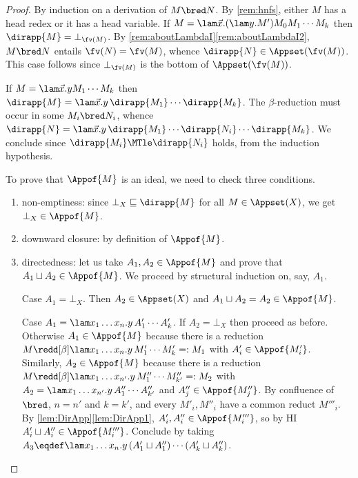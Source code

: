 	\begin{proof}
	\bsub
	\item By induction on a derivation of $M\bred N$. By \cref{rem:hnfs}, 
		either $M$ has a head redex or it has a head variable.
		If $M = \lam \vec x.(\lam y.M')M_0M_1\cdots M_k$ then 
		$\dirapp{M} = \bot_{\fv(M)}$. 
		By \cref{rem:aboutLambdaI}\eqref{rem:aboutLambdaI2}, 
		$M\bred N$ entails $\fv(N) = \fv(M)$, 
		whence $\dirapp{N}\in\Appset(\fv(M))$.
		This case follows since $\bot_{\fv(M)}$ is the bottom of 
		$\Appset(\fv(M))$.
		
		If $M = \lam \vec x.yM_1\cdots M_k$ then $\dirapp{M} = \lam \vec 
		x.y\,\dirapp{M_1}\cdots \dirapp{M_k}$.
		The $\beta$-reduction must occur in some $M_i\bred N_i$, whence 
		$\dirapp{N} = \lam \vec x.y\,\dirapp{M_1}\cdots \dirapp{N_i}\cdots 
		\dirapp{M_k}$. We conclude since $\dirapp{M_i}\MTle\dirapp{N_i}$ 
		holds, from the induction hypothesis.
			
		\item To prove that $\Appof{M}$ is an ideal, we need to check three 
		conditions.
		\begin{enumerate}
		\item
			non-emptiness: since $\bot_{X}\sqsubseteq \dirapp{M}$ for all 
			$M\in\Appset(X)$, we get $\bot_{X} \in \Appof{M}$.
		\item
			downward closure: by definition of $\Appof{M}$.
		\item
			directedness: let us take $A_1,A_2\in\Appof{M}$ and prove that 
			$A_1\sqcup A_2\in\Appof{M}$.
			We proceed by structural induction on, say, $A_1$.
			
			Case $A_1 = \bot_X$. Then $A_2\in\Appset(X)$ and $A_1\sqcup A_2 
			= A_2\in\Appof{M}$.
			
			Case $A_1 = \lam x_1\ldots x_n.y\,A'_1\cdots A'_k$. If $A_2 = 
			\bot_X$ then proceed as before. Otherwise $A_1\in\Appof{M}$ 
			because there is a reduction $M\redd[\beta] \lam x_1\ldots 
			x_n.y\,M'_1\cdots M'_k=:M_1$ with $A'_i\in\Appof{M'_i}$.
			Similarly, $A_2\in\Appof{M}$ because there is a reduction 
			$M\redd[\beta] \lam x_1\ldots x_{n'}.y\,M''_1\cdots 
			M''_{k'}=:M_2$ with $A_2 = \lam x_1\ldots x_{n'}.y\,A''_1\cdots 
			A''_{k'} $ and $A''_j\in\Appof{M''_j}$.
			By confluence of $\bred$, $n = n'$ and $k = k'$, and every 
			$M'_i,M''_i$ have a common reduct $M'''_i$.
			By \cref{lem:DirApp}\eqref{lem:DirApp1}, 
			$A'_i,A''_i\in\Appof{M'''_i}$, so by HI $A'_i\sqcup 
			A''_i\in\Appof{M'''_i}$.
			Conclude by taking $A_3 \eqdef \lam x_1\ldots x_n.y\,(A'_1\sqcup 
			A''_1)\cdots (A'_k\sqcup A''_k)$.\qedhere
		\end{enumerate}
	\esub
	\end{proof}

